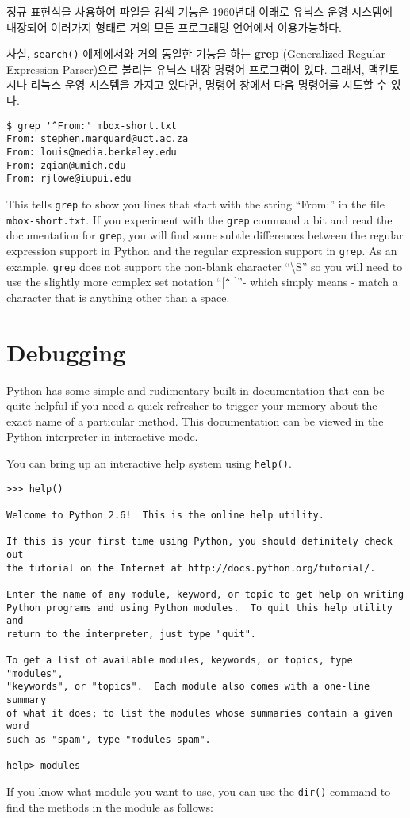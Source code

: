 정규 표현식을 사용하여 파일을 검색 기능은 1960년대 이래로 유닉스 운영 시스템에 내장되어
여러가지 형태로 거의 모든 프로그래밍 언어에서 이용가능하다.


사실, {\tt search()} 예제에서와 거의 동일한 기능을 하는 {\bf grep} (Generalized Regular Expression Parser)으로 불리는 유닉스 내장 명령어 프로그램이 있다.
그래서, 맥킨토시나 리눅스 운영 시스템을 가지고 있다면, 명령어 창에서 다음 명령어를 시도할 수 있다.

\beforeverb
\begin{verbatim}
$ grep '^From:' mbox-short.txt
From: stephen.marquard@uct.ac.za
From: louis@media.berkeley.edu
From: zqian@umich.edu
From: rjlowe@iupui.edu
\end{verbatim}
\afterverb
%
This tells {\tt grep} to show you lines that start with the string ``From:'' in the file {\tt mbox-short.txt}.   If you experiment with the {\tt grep} command a bit and read the documentation for {\tt grep}, you will find some subtle differences between the regular expression support in Python and the regular expression support in {\tt grep}.  As an example, {\tt grep} does not support the non-blank character ``{\textbackslash}S'' so you will need to use the slightly more complex set notation ``[\verb"^" ]''- which simply means - match a character that is anything other than a space.

\section{Debugging}

Python has some simple and rudimentary built-in documentation that can be quite helpful if you need a quick refresher to trigger your memory about the exact name of a particular method.   This documentation can be viewed in the Python interpreter in interactive mode.

You can bring up an interactive help system using {\tt help()}.

\beforeverb
\begin{verbatim}
>>> help()

Welcome to Python 2.6!  This is the online help utility.

If this is your first time using Python, you should definitely check out
the tutorial on the Internet at http://docs.python.org/tutorial/.

Enter the name of any module, keyword, or topic to get help on writing
Python programs and using Python modules.  To quit this help utility and
return to the interpreter, just type "quit".

To get a list of available modules, keywords, or topics, type "modules",
"keywords", or "topics".  Each module also comes with a one-line summary
of what it does; to list the modules whose summaries contain a given word
such as "spam", type "modules spam".

help> modules
\end{verbatim}
\afterverb
%
If you know what module you want to use, you can use the {\tt dir()} command to find the methods in the module as follows:

